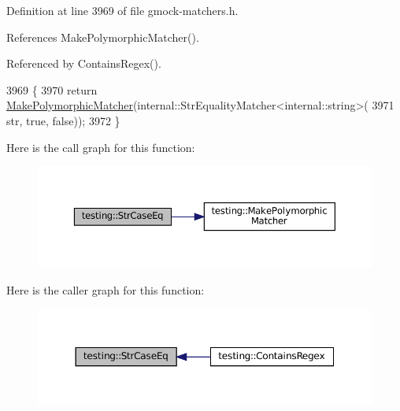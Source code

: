 Definition at line 3969 of file gmock-\/matchers.\+h.



References Make\+Polymorphic\+Matcher().



Referenced by Contains\+Regex().


\begin{DoxyCode}
3969                                          \{
3970   \textcolor{keywordflow}{return} \hyperlink{namespacetesting_a667ca94f190ec2e17ee2fbfdb7d3da04}{MakePolymorphicMatcher}(internal::StrEqualityMatcher<internal::string>(
3971       str, \textcolor{keyword}{true}, \textcolor{keyword}{false}));
3972 \}
\end{DoxyCode}
Here is the call graph for this function\+:
\nopagebreak
\begin{figure}[H]
\begin{center}
\leavevmode
\includegraphics[width=350pt]{namespacetesting_addbdb8c0902ab09cade24fa6db7c0073_cgraph}
\end{center}
\end{figure}
Here is the caller graph for this function\+:
\nopagebreak
\begin{figure}[H]
\begin{center}
\leavevmode
\includegraphics[width=350pt]{namespacetesting_addbdb8c0902ab09cade24fa6db7c0073_icgraph}
\end{center}
\end{figure}
\mbox{\label{namespacetesting_a9596fd67bdd5df195bc54382f91a1906}} 
